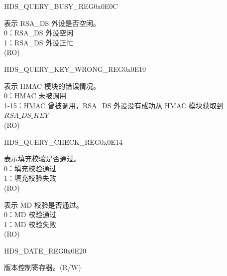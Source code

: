 \begin{register}{H}{DS\_QUERY\_BUSY\_REG}{0x0E0C}\label{regdesc:DSQUERYBUSYREG}
%
%
\regnewline%
\begin{regdesc}\begin{reglist}
\item [DS\_QUERY\_BUSY] 表示 RSA\_DS 外设是否空闲。\\
0：RSA\_DS 外设空闲\\
1：RSA\_DS 外设正忙\\
(RO)
\end{reglist}\end{regdesc}
\end{register}


\begin{register}{H}{DS\_QUERY\_KEY\_WRONG\_REG}{0x0E10}\label{regdesc:DSQUERYKEYWRONGREG}
%
%
\regnewline%
\begin{regdesc}\begin{reglist}
\item [DS\_QUERY\_KEY\_WRONG] 表示 HMAC 模块的错误情况。\\
0：HMAC 未被调用\\
1-15：HMAC 曾被调用，RSA\_DS 外设没有成功从 HMAC 模块获取到 \begin{math}RSA\_DS\_KEY\end{math}\\
(RO)
\end{reglist}\end{regdesc}
\end{register}


\begin{register}{H}{DS\_QUERY\_CHECK\_REG}{0x0E14}\label{regdesc:DSQUERYCHECKREG}
%
%
%
\regnewline%
\begin{regdesc}\begin{reglist}
\item [DS\_PADDING\_BAD] 表示填充校验是否通过。\\ 
0：填充校验通过\\
1：填充校验失败\\
(RO)
\item [DS\_MD\_ERROR] 表示 MD 校验是否通过。\\
0：MD 校验通过\\
1：MD 校验失败\\
(RO)
\end{reglist}\end{regdesc}
\end{register}


\begin{register}{H}{DS\_DATE\_REG}{0x0E20}\label{regdesc:DSDATEREG}
%
%
\regnewline%
\begin{regdesc}\begin{reglist}
\item [DS\_DATE] 版本控制寄存器。(R/W)
\end{reglist}\end{regdesc}
\end{register}
